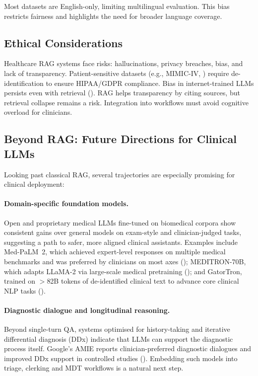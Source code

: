 Most datasets are English-only, limiting multilingual evaluation. This bias restricts fairness and highlights the need for broader language coverage.

\subsection{Ethical Considerations}

Healthcare RAG systems face risks: hallucinations, privacy breaches, bias, and lack of transparency. Patient-sensitive datasets (e.g., MIMIC-IV, \citep{johnson2023mimiciv}) require de-identification to ensure HIPAA/GDPR compliance. Bias in internet-trained LLMs persists even with retrieval (\citep{mehrabi2021survey}). RAG helps transparency by citing sources, but retrieval collapse remains a risk. Integration into workflows must avoid cognitive overload for clinicians.

\subsection{Beyond RAG: Future Directions for Clinical LLMs}

Looking past classical RAG, several trajectories are especially promising for clinical deployment:

\paragraph{Domain-specific foundation models.}
Open and proprietary medical LLMs fine-tuned on biomedical corpora show consistent gains over general models on exam-style and clinician-judged tasks, suggesting a path to safer, more aligned clinical assistants. Examples include Med-PaLM~2, which achieved expert-level responses on multiple medical benchmarks and was preferred by clinicians on most axes (\citep{singhal2024medpalm2}); MEDITRON-70B, which adapts LLaMA-2 via large-scale medical pretraining (\citep{chen2023meditron}); and GatorTron, trained on $>$82B tokens of de-identified clinical text to advance core clinical NLP tasks (\citep{yang2022gatortron}).

\paragraph{Diagnostic dialogue and longitudinal reasoning.}
Beyond single-turn QA, systems optimised for history-taking and iterative differential diagnosis (DDx) indicate that LLMs can support the diagnostic process itself. Google’s AMIE reports clinician-preferred diagnostic dialogues and improved DDx support in controlled studies (\citep{amie2025nature,amie2024blog}). Embedding such models into triage, clerking and MDT workflows is a natural next step.

